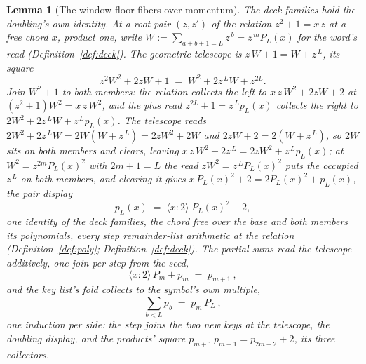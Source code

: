 \documentclass[11pt]{article}
\newtheorem{lemma}{Lemma}
\theoremstyle{definition}
\begin{document}
\begin{lemma}[The window floor fibers over momentum]
The deck families hold the doubling's own identity. At a root pair
$(z,z')$ of the relation $z^2+1=x\,z$ at a free chord $x$, product
one, write $W:=\sum_{a+b+1=L}z^{\,b}=z^{\,m}P_L(x)$ for the word's
read (Definition~\ref{def:deck}). The geometric telescope is
$z\,W+1=W+z^{\,L}$, its square
\[
z^2W^2+2zW+1\;=\;W^2+2z^{\,L}W+z^{2L} .
\]
Join $W^2+1$ to both members: the relation collects the left to
$x\,z\,W^2+2zW+2$ at $(z^2+1)W^2=x\,z\,W^2$, and the plus read
$z^{2L}+1=z^{\,L}p_L(x)$ collects the right to
$2W^2+2z^{\,L}W+z^{\,L}p_L(x)$. The telescope reads
$2W^2+2z^{\,L}W=2W(W+z^{\,L})=2zW^2+2W$ and
$2zW+2=2(W+z^{\,L})$, so $2W$ sits on both members and clears,
leaving $x\,z\,W^2+2z^{\,L}=2zW^2+z^{\,L}p_L(x)$; at
$W^2=z^{2m}P_L(x)^2$ with $2m+1=L$ the read $zW^2=z^{\,L}P_L(x)^2$
puts the occupied $z^{\,L}$ on both members, and clearing it gives
$x\,P_L(x)^2+2=2P_L(x)^2+p_L(x)$, the pair display
\[
p_L(x)\;=\;\langle x\!:\!2\rangle\;P_L(x)^2+2 ,
\]
one identity of the deck families, the chord free over the base and
both members its polynomials, every step remainder-list arithmetic at
the relation (Definition~\ref{def:poly}; Definition~\ref{def:deck}).
The partial sums read the telescope additively, one join per step
from the seed,
\[
\langle x\!:\!2\rangle\,P_m+p_m\;=\;p_{m+1}\ ,
\]
and the key list's fold collects to the symbol's own multiple,
\[
\sum_{b<L}p_b\;=\;p_m\,P_L\ ,
\]
one induction per side: the step joins the two new keys at the
telescope, the doubling display, and the products' square
$p_{m+1}\,p_{m+1}=p_{2m+2}+2$, its three collectors.


\end{lemma}
\end{document}
